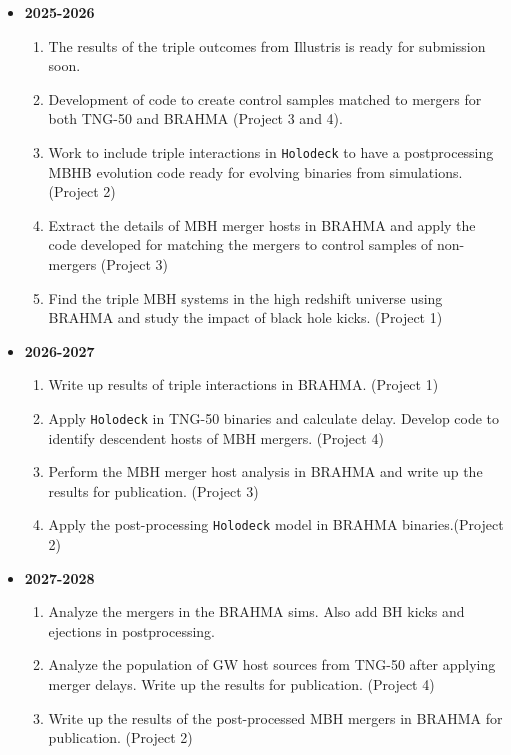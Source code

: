 \documentclass[11pt, letterpaper]{article}
\begin{document}
\begin{itemize}
    \item \textbf{2025-2026}
    \begin{enumerate}
        \item The results of the triple outcomes from Illustris is ready for submission soon.
        \item Development of code to create control samples matched to mergers for both TNG-50 and BRAHMA (Project 3 and 4).
        \item Work to include triple interactions in \texttt{Holodeck} to have a postprocessing MBHB evolution code ready for evolving binaries from simulations. (Project 2)
        \item Extract the details of MBH merger hosts in BRAHMA and apply the code developed for matching the mergers to control samples of non-mergers (Project 3)
        \item Find the triple MBH systems in the high redshift universe using BRAHMA and study the impact of black hole kicks. (Project 1)
        
    \end{enumerate}
    \item \textbf{2026-2027}
    \begin{enumerate}
        \item Write up results of triple interactions in BRAHMA. (Project 1)
        \item Apply \texttt{Holodeck} in TNG-50 binaries and calculate delay. Develop code to identify descendent hosts of MBH mergers. (Project 4)
        \item Perform the MBH merger host analysis in BRAHMA and write up the results for publication. (Project 3)
        \item Apply the post-processing \texttt{Holodeck} model in BRAHMA binaries.(Project 2) 
    \end{enumerate}
    \item \textbf{2027-2028}
    \begin{enumerate}
        \item Analyze the mergers in the BRAHMA sims. Also add BH kicks and ejections in postprocessing.
        \item Analyze the population of GW host sources from TNG-50 after applying merger delays. Write up the results for publication. (Project 4)
        \item Write up the results of the post-processed MBH mergers in BRAHMA for publication. (Project 2)
    \end{enumerate}
\end{itemize}

% 


{}


\newpage

% 
\end{document}
